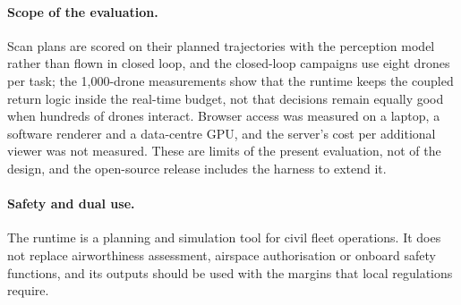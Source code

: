 \paragraph{Scope of the evaluation.} Scan plans are scored on their planned trajectories with the perception model
rather than flown in closed loop, and the closed-loop campaigns use eight drones per task; the 1,000-drone measurements
show that the runtime keeps the coupled return logic inside the real-time budget, not that decisions remain equally
good when hundreds of drones interact. Browser access was measured on a laptop, a software renderer and a data-centre
GPU, and the server's cost per additional viewer was not measured. These are limits of the present evaluation, not of
the design, and the open-source release includes the harness to extend it.

\paragraph{Safety and dual use.} The runtime is a planning and simulation tool for civil fleet operations. It does not
replace airworthiness assessment, airspace authorisation or onboard safety functions, and its outputs should be used
with the margins that local regulations require.

